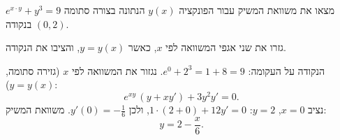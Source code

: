 
\begin{question}
מצאו את משוואת המשיק עבור הפונקציה $y(x)$ הנתונה בצורה סתומה $e^{x\cdot y}+y^3=9$ בנקודה $(0,2)$.
\end{question}

\begin{hint}
גזרו את שני אגפי המשוואה לפי $x$, כאשר $y=y(x)$, והציבו את הנקודה.
\end{hint}

\begin{solution}
הנקודה על העקומה: $e^{0}+2^3=1+8=9$. נגזור את המשוואה לפי $x$ (גזירה סתומה, $y=y(x)$):
\[ e^{xy}\,(y+xy')+3y^2y'=0 . \]
נציב $x=0$, $y=2$: $1\cdot(2+0)+12y'=0$, ולכן $y'(0)=-\frac16$. משוואת המשיק:
\[ \boxed{y=2-\frac{x}{6}} . \]
\end{solution}
